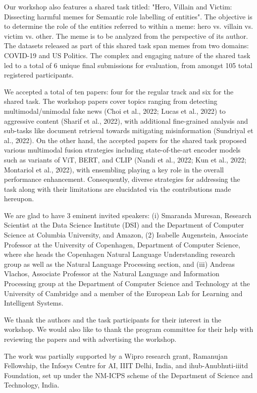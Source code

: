Our workshop also features a shared task titled: "Hero, Villain and Victim: Dissecting harmful memes for Semantic role labelling of entities". The objective is to determine the role of the entities referred to within a meme: hero vs. villain vs. victim vs. other. The meme is to be analyzed from the perspective of its author. The datasets released as part of this shared task span memes from two domains: COVID-19 and US Politics. The complex and engaging nature of the shared task led to a total of 6 unique final submissions for evaluation, from amongst 105 total registered participants.

We accepted a total of ten papers: four for the regular track and six for the shared task. The workshop papers cover topics ranging from detecting multimodal/unimodal fake news (Choi et al., 2022; Lucas et al., 2022) to aggressive content (Sharif et al., 2022), with additional fine-grained analysis and sub-tasks like document retrieval towards mitigating misinformation (Sundriyal et al., 2022). On the other hand, the accepted papers for the shared task proposed various multimodal fusion strategies including state-of-the-art encoder models such as variants of ViT, BERT, and CLIP (Nandi et al., 2022; Kun et al., 2022; Montariol et al., 2022), with ensembling playing a key role in the overall performance enhancement. Consequently, diverse strategies for addressing the task along with their limitations are elucidated via the contributions made hereupon. 

We are glad to have 3 eminent invited speakers: (i) Smaranda Muresan, Research Scientist at the Data Science Institute (DSI) and the Department of Computer Science at Columbia University, and Amazon, (2) Isabelle Augenstein, Associate Professor at the University of Copenhagen, Department of Computer Science, where she heads the Copenhagen Natural Language Understanding research group as well as the Natural Language Processing section, and (iii) Andreas Vlachos, Associate Professor at the Natural Language and Information Processing group at the Department of Computer Science and Technology at the University of Cambridge and a member of the European Lab for Learning and Intelligent Systems.

We thank the authors and the task participants for their interest in the workshop. We would also like to thank the program committee for their help with reviewing the papers and with advertising the workshop.

The work was partially supported by a Wipro research grant, Ramanujan Fellowship, the Infosys Centre for AI, IIIT Delhi, India, and ihub-Anubhuti-iiitd Foundation, set up under the NM-ICPS scheme of the Department of Science and Technology, India.

